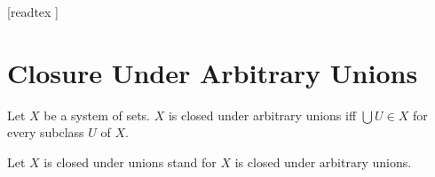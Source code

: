 \documentclass[10pt]{article}
\begin{document}
  \begin{imports}
    \begin{forthel}
      [readtex ]
    \end{forthel}
  \end{imports}


  \section*{Closure Under Arbitrary Unions}

  \begin{forthel}
    \begin{definition}
      Let $X$ be a system of sets.
      $X$ is closed under arbitrary unions iff $\bigcup U \in X$ for every  subclass $U$ of $X$.
    \end{definition}

    Let $X$ is closed under unions stand for $X$ is closed under arbitrary unions.
  \end{forthel}
\end{document}
